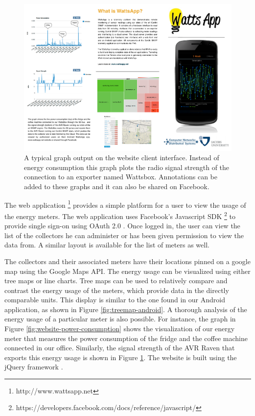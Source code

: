 \documentclass[10pt, conference, compsocconf]{IEEEtran}
\begin{document}
\begin{figure}[t]
\begin{centering}
\includegraphics[scale=0.93]{images/signal-strength} 
\par\end{centering}

\caption{A typical graph output on the website client interface. Instead of
energy consumption this graph plots the radio signal strength of the
connection to an exporter named Wattsbox. Annotations can be added
to these graphs and it can also be shared on Facebook. }


\label{fig:website-signal-strength}
\end{figure}

The web application%
\footnote{http://www.wattsapp.net%
} provides a simple platform for a user to view the usage of the energy
meters. The web application uses Facebook's Javascript SDK %
\footnote{https://developers.facebook.com/docs/reference/javascript/%
} to provide single sign-on using OAuth 2.0 \cite{oauth}. Once logged
in, the user can view the list of the collectors he can administer
or has been given permission to view the data from. A similar layout
is available for the list of meters as well.

The collectors and their associated meters have their locations pinned
on a google map using the Google Maps API. The energy usage can be
visualized using either tree maps or line charts. Tree maps can be
used to relatively compare and contrast the energy usage of the meters,
which provide data in the directly comparable units. This display
is similar to the one found in our Android application, as shown in
Figure \ref{fig:treemap-android}. A thorough analysis of the energy
usage of a particular meter is also possible. For instance, the graph
in Figure \ref{fig:website-power-consumption} shows the visualization
of our energy meter that measures the power consumption of the fridge
and the coffee machine connected in our office. Similarly, the signal
strength of the AVR Raven that exports this energy usage is shown
in Figure \ref{fig:website-signal-strength}. The website is built
using the jQuery framework \cite{Bibeault:2008:JA:1407181}.
\end{document}
